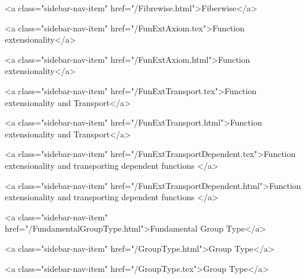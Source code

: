       
    
      
        
          <a class="sidebar-nav-item" href="/Fibrewise.html">Fiberwise</a>
        
      
    
      
        
          <a class="sidebar-nav-item" href="/FunExtAxiom.tex">Function extensionality</a>
        
      
    
      
        
          <a class="sidebar-nav-item" href="/FunExtAxiom.html">Function extensionality</a>
        
      
    
      
        
          <a class="sidebar-nav-item" href="/FunExtTransport.tex">Function extensionality and Transport</a>
        
      
    
      
        
          <a class="sidebar-nav-item" href="/FunExtTransport.html">Function extensionality and Transport</a>
        
      
    
      
        
          <a class="sidebar-nav-item" href="/FunExtTransportDependent.tex">Function extensionality and transporting dependent functions </a>
        
      
    
      
        
          <a class="sidebar-nav-item" href="/FunExtTransportDependent.html">Function extensionality and transporting dependent functions </a>
        
      
    
      
        
          <a class="sidebar-nav-item" href="/FundamentalGroupType.html">Fundamental Group Type</a>
        
      
    
      
        
          <a class="sidebar-nav-item" href="/GroupType.html">Group Type</a>
        
      
    
      
        
          <a class="sidebar-nav-item" href="/GroupType.tex">Group Type</a>
        
      
    
